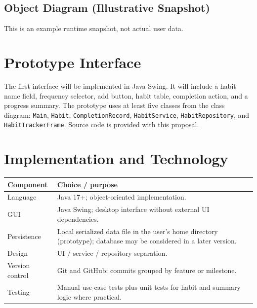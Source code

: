 \documentclass[11pt,a4paper]{article}
\begin{document}
\subsection{Object Diagram (Illustrative Snapshot)}
\begin{center}
\end{center}
This is an example runtime snapshot, not actual user data.

\section{Prototype Interface}
The first interface will be implemented in Java Swing. It will include a habit name field, frequency selector, add button, habit table, completion action, and a progress summary. The prototype uses at least five classes from the class diagram: \texttt{Main}, \texttt{Habit}, \texttt{CompletionRecord}, \texttt{HabitService}, \texttt{HabitRepository}, and \texttt{HabitTrackerFrame}. Source code is provided with this proposal.

\section{Implementation and Technology}
\begin{tabularx}{\linewidth}{lX}
\toprule
Component & Choice / purpose\\ \midrule
Language & Java 17+; object-oriented implementation.\\
GUI & Java Swing; desktop interface without external UI dependencies.\\
Persistence & Local serialized data file in the user's home directory (prototype); database may be considered in a later version.\\
Design & UI / service / repository separation.\\
Version control & Git and GitHub; commits grouped by feature or milestone.\\
Testing & Manual use-case tests plus unit tests for habit and summary logic where practical.\\
\bottomrule
\end{tabularx}
\end{document}
